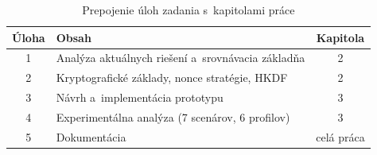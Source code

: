 \begin{table}[!ht]
\renewcommand{\arraystretch}{1.3}
\centering
\caption{Prepojenie úloh zadania s~kapitolami práce}
\label{tab:tasks_mapping}
\small
\begin{tabular}{c p{6.5cm} c}
\toprule
\textbf{Úloha} & \textbf{Obsah} & \textbf{Kapitola} \\
\midrule
1 & Analýza aktuálnych riešení a~srovnávacia základňa & 2 \\
2 & Kryptografické základy, nonce stratégie, HKDF & 2 \\
3 & Návrh a~implementácia prototypu & 3 \\
4 & Experimentálna analýza (7 scenárov, 6 profilov) & 3 \\
5 & Dokumentácia & celá práca \\
\bottomrule
\end{tabular}
\normalsize
\end{table}